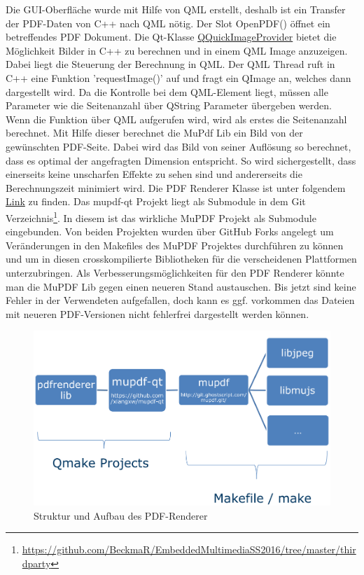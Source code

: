Die GUI-Oberfläche wurde mit Hilfe von QML erstellt, deshalb ist ein Transfer der PDF-Daten von C++ nach QML nötig. Der Slot OpenPDF() öffnet ein betreffendes PDF Dokument. Die Qt-Klasse \href{http://doc.qt.io/qt-5/qquickimageprovider.html}{QQuickImageProvider} bietet die Möglichkeit Bilder in C++ zu berechnen und in einem QML Image anzuzeigen. Dabei liegt die Steuerung der Berechnung in QML. Der QML Thread ruft in C++ eine Funktion 'requestImage()' auf und fragt ein QImage an, welches dann dargestellt wird. Da die Kontrolle bei dem QML-Element liegt, müssen alle Parameter wie die Seitenanzahl über QString Parameter übergeben werden.
Wenn die Funktion über QML aufgerufen wird, wird als erstes die Seitenanzahl berechnet. Mit Hilfe dieser berechnet die MuPdf Lib ein Bild von der gewünschten PDF-Seite. Dabei wird das Bild von seiner Auflösung so berechnet, dass es optimal der angefragten Dimension entspricht. So wird sichergestellt, dass einerseits keine unscharfen Effekte zu sehen sind und andererseits die Berechnungszeit minimiert wird.
Die PDF Renderer Klasse ist unter folgendem \href{https://github.com/BeckmaR/EmbeddedMultimediaSS2016/tree/master/src/pdfrenderer}{Link} zu finden. Das mupdf-qt Projekt liegt als Submodule in dem Git Verzeichnis\footnote{\url{https://github.com/BeckmaR/EmbeddedMultimediaSS2016/tree/master/thirdparty}}. In diesem ist das wirkliche MuPDF Projekt als Submodule eingebunden. Von beiden Projekten wurden über GitHub Forks angelegt um Veränderungen in den Makefiles des MuPDF Projektes durchführen zu können und um in diesen crosskompilierte Bibliotheken für die verscheidenen Plattformen unterzubringen.
Als Verbesserungsmöglichkeiten für den PDF Renderer könnte man die MuPDF Lib gegen einen neueren Stand austauschen. Bis jetzt sind keine Fehler in der Verwendeten aufgefallen, doch kann es ggf. vorkommen das Dateien mit neueren PDF-Versionen nicht fehlerfrei dargestellt werden können.

\begin{figure}[ht!]
\centering
\includegraphics[width=\textwidth]{PdfRenderer/pdfrenderer_aufbau.png}
\caption{Struktur und Aufbau des PDF-Renderer}
\end{figure}


 

